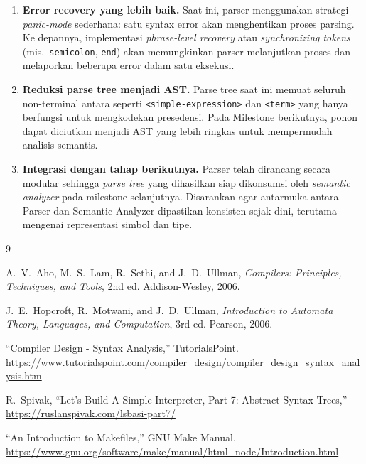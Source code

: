 \documentclass[11pt,a4paper]{article}
\begin{document}
\begin{enumerate}
    \item \textbf{Error recovery yang lebih baik.}
          Saat ini, parser menggunakan strategi \textit{panic-mode} sederhana:
          satu syntax error akan menghentikan proses parsing. Ke depannya,
          implementasi \textit{phrase-level recovery} atau \textit{synchronizing
          tokens} (mis.\ \texttt{semicolon}, \texttt{end}) akan memungkinkan
          parser melanjutkan proses dan melaporkan beberapa error dalam satu
          eksekusi.
    \item \textbf{Reduksi parse tree menjadi AST.}
          Parse tree saat ini memuat seluruh non-terminal antara seperti
          \texttt{<simple-expression>} dan \texttt{<term>} yang hanya berfungsi
          untuk mengkodekan presedensi. Pada Milestone berikutnya, pohon dapat
          diciutkan menjadi AST yang lebih ringkas untuk mempermudah analisis
          semantis.
    \item \textbf{Integrasi dengan tahap berikutnya.}
          Parser telah dirancang secara modular sehingga \textit{parse tree}
          yang dihasilkan siap dikonsumsi oleh \textit{semantic analyzer} pada
          milestone selanjutnya. Disarankan agar antarmuka antara Parser dan
          Semantic Analyzer dipastikan konsisten sejak dini, terutama mengenai
          representasi simbol dan tipe.
\end{enumerate}

\newpage
\begin{thebibliography}{9}

A.~V.~Aho, M.~S.~Lam, R.~Sethi, and J.~D.~Ullman,
\textit{Compilers: Principles, Techniques, and Tools}, 2nd ed.
Addison-Wesley, 2006.

J.~E.~Hopcroft, R.~Motwani, and J.~D.~Ullman,
\textit{Introduction to Automata Theory, Languages, and Computation}, 3rd ed.
Pearson, 2006.

``Compiler Design - Syntax Analysis,''
TutorialsPoint.
\url{https://www.tutorialspoint.com/compiler_design/compiler_design_syntax_analysis.htm}

R.~Spivak, ``Let's Build A Simple Interpreter, Part 7: Abstract Syntax Trees,''
\url{https://ruslanspivak.com/lsbasi-part7/}

``An Introduction to Makefiles,''
GNU Make Manual.
\url{https://www.gnu.org/software/make/manual/html_node/Introduction.html}

\end{thebibliography}
\end{document}
